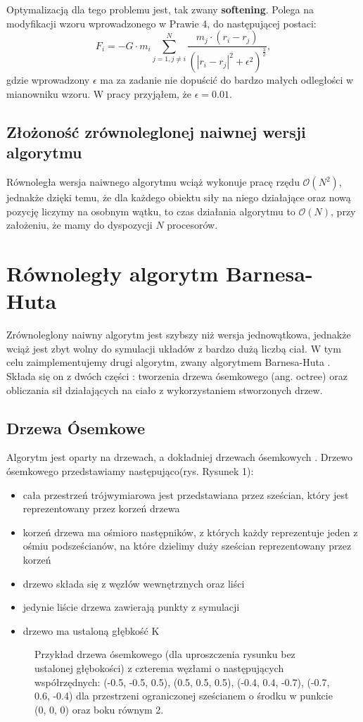\documentclass[14pt,twoside,a4paper]{article}
\theoremstyle{definition}
\begin{document}
Optymalizacją dla tego problemu jest, tak zwany \textbf{softening}\cite[str.~21]{Aarseth}. Polega na modyfikacji wzoru wprowadzonego w Prawie 4, do następującej postaci:
$$F_i = -G\cdot m_i \sum_{j=1, j\neq i}^N \frac{m_j\cdot (r_i - r_j)}{(|r_i - r_j|^2 + \epsilon^{2})^{\frac{3}{2}}},$$ 
gdzie wprowadzony $\epsilon$ ma za zadanie nie dopuścić do bardzo małych odległości w mianowniku wzoru. W pracy przyjąłem, że $\epsilon = 0.01$.

\subsection{\Large Złożoność zrównoleglonej naiwnej wersji algorytmu}
Równoległa wersja naiwnego algorytmu wciąż wykonuje pracę rzędu $\mathcal{O}(N^{2})$, jednakże dzięki temu, że dla każdego obiektu siły na niego działające oraz nową pozycję liczymy na osobnym wątku, to czas działania algorytmu to $\mathcal{O}(N)$, przy założeniu, że mamy do dyspozycji $N$ procesorów.

\section{\LARGE Równoległy algorytm Barnesa-Huta}
Zrównoleglony naiwny algorytm jest szybszy niż wersja jednowątkowa, jednakże wciąż jest zbyt wolny do symulacji układów z bardzo dużą liczbą ciał. W tym celu zaimplementujemy drugi algorytm, zwany algorytmem Barnesa-Huta \cite[str.~446-449]{barnhut}. Składa się on z dwóch części : tworzenia drzewa ósemkowego (ang. octree) oraz obliczania sił działających na ciało z wykorzystaniem stworzonych drzew.

\subsection{\Large Drzewa Ósemkowe}
Algorytm jest oparty na drzewach, a dokładniej drzewach ósemkowych \cite{octree}.
Drzewo ósemkowego przedstawiamy następująco(rys. Rysunek 1):
\begin{itemize}
  \item cała przestrzeń trójwymiarowa jest przedstawiana przez sześcian, który jest reprezentowany przez korzeń drzewa
  \item korzeń drzewa ma ośmioro następników, z których każdy reprezentuje jeden z ośmiu podsześcianów, na które dzielimy duży sześcian reprezentowany przez korzeń
  \item drzewo składa się z węzłów wewnętrznych oraz liści
  \item jedynie liście drzewa zawierają punkty z symulacji
  \item drzewo ma ustaloną głębkość K
\end{itemize}
\bigskip
\begin{figure}
    \centering
    \def\svgwidth{\columnwidth}
    
    \caption{Przykład drzewa ósemkowego (dla uproszczenia rysunku bez ustalonej głębokości) z czterema węzłami o następujących współrzędnych: (-0.5, -0.5, 0.5), (0.5, 0.5, 0.5), (-0.4, 0.4, -0.7), (-0.7, 0.6, -0.4) dla przestrzeni ograniczonej sześcianem o środku w punkcie (0, 0, 0) oraz boku równym 2.}
\end{figure}
\end{document}
